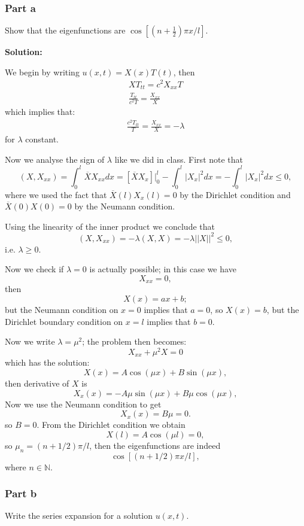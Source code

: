 \documentclass{article}
\begin{document}
\subsubsection{Part a}
Show that the eigenfunctions are $\cos\left[\left(n+\frac{1}{2}\right)\pi x/l\right]$.

\textbf{Solution:}

We begin by writing $u(x,t)=X(x)T(t)$, then
\begin{align*}
XT_{tt}=c^2X_{xx}T\\
\frac{T_{tt}}{c^2T}=\frac{X_{xx}}{X}
\end{align*}
which implies that:
\begin{align*}
\frac{c^2T_{tt}}{T}=\frac{X_{xx}}{X}=-\lambda
\end{align*}
for $\lambda$ constant.

Now we analyse the sign of $\lambda$ like we did in
class. First note that
\[
(X,X_{xx})=\int_0^l\overline{X}X_{xx}dx
=[\overline{X}X_x]\Big|_0^l-\int_0^l|X_x|^2dx
=-\int_0^l|X_x|^2dx\leq 0,
\]
where we used the fact that $\overline{X}(l)X_x(l)=0$ by the Dirichlet
condition and  $\overline{X}(0)X(0)=0$ by the Neumann condition.

Using the linearity of the inner product we conclude that
\[
    (X,X_{xx})=-\lambda(X,X)=-\lambda||X||^2\leq 0,
\]
i.e. $\lambda \geq 0$.

Now we check if $\lambda=0$ is actually possible; in this case we have
\[
    X_{xx}=0,
\]
then
\[
    X(x)=ax+b;
\]
but the Neumann condition on $x=0$ implies that $a=0$, so $X(x)=b$, but the
Dirichlet boundary condition on $x=l$ implies that $b=0$.


Now we write $\lambda=\mu^2$; the problem then becomes:
\[
    X_{xx}+\mu^2X=0
\]
which has the solution:
\[
X(x) = A\cos(\mu x)+B\sin(\mu x),
\]
then derivative of $X$ is
\[
X_x(x) = -A\mu\sin(\mu x)+B\mu\cos(\mu x),
\]
Now we use the Neumann condition to get
\[
    X_x(x)=B\mu=0.
\]
so $B=0$. From the Dirichlet condition we obtain
\[
X(l)=A\cos(\mu l)=0,
\]
so $\mu_n = (n+1/2)\pi/l$, then the eigenfunctions are indeed
\[
\cos\left[\left(n+1/2\right)\pi x/l\right],
\]
where $n\in \mathbb{N}$.
\subsubsection{Part b}
Write the series expansion for a solution $u(x,t)$.
\end{document}
